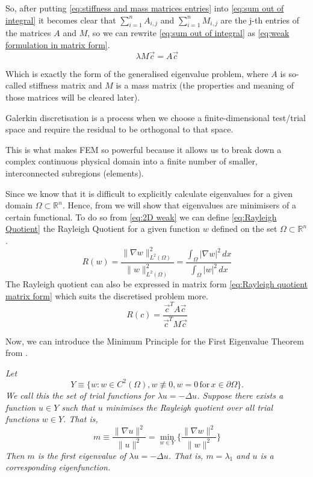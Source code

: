 \documentclass[acmsmall,screen]{MapleTrans}
\begin{document}
So, after putting \eqref{eq:stiffness and mass matrices entries} into \eqref{eq:sum out of integral} it becomes clear that $\sum^n_{i=1}A_{i,j}$ and $\sum^n_{i=1}M_{i,j}$ are the j-th entries of the matrices $A$ and $M$, so we can rewrite \eqref{eq:sum out of integral} as \eqref{eq:weak formulation in matrix form}.
\begin{equation}
    \lambda M\vec{c} = A\vec{c} 
    \label{eq:weak formulation in matrix form}
\end{equation}

Which is exactly the form of the generalised eigenvalue problem, where $A$ is so-called stiffness matrix and $M$ is a mass matrix (the properties and meaning of those matrices will be cleared later). 

Galerkin discretisation is a process when we choose a finite-dimensional test/trial space and require the residual to be orthogonal to that space.

This is what makes FEM so powerful because it allows us to break down a complex continuous physical domain into a finite number of smaller, interconnected subregions (elements).

Since we know that it is difficult to explicitly calculate eigenvalues for a given domain $\Omega \subset \mathbb{R}^n$. Hence, from \cite{b9.1} we will show that eigenvalues are minimisers of a certain functional.
To do so from \eqref{eq:2D weak} we can define \eqref{eq:Rayleigh Quotient} the Rayleigh Quotient for a given function $w$ defined on the set $\Omega \subset \mathbb{R}^n$.
\begin{equation}
    R(w) = \frac{\|\nabla w\|_{L^2(\Omega)}^2}{\|w\|_{L^2(\Omega)}^2} = \frac{\int_\Omega |\nabla w|^2 \, dx}{\int_\Omega |w|^2 \, dx}
    \label{eq:Rayleigh Quotient}
\end{equation}
The Rayleigh quotient can also be expressed in matrix form \eqref{eq:Rayleigh quotient matrix form} which suits the discretised problem more.
\begin{equation}
    R(c) = \frac{\vec{c}^TA\vec{c}}{\vec{c}^TM\vec{c}}
    \label{eq:Rayleigh quotient matrix form}
\end{equation}


Now, we can introduce the Minimum Principle for the First Eigenvalue Theorem from \cite{b0,b9.1}.

\textit{
    Let
    \begin{equation}
        Y \equiv \{w: w \in C^2(\Omega), w \not\equiv 0, w = 0 \, \text{for} \, x \in \partial\Omega\}.
    \end{equation}
    We call this the set of trial functions for $\lambda u = -\Delta u$. Suppose there exists a function $u \in Y$ such that $u$ minimises the Rayleigh quotient over all trial functions $w \in Y$.
    That is,
    \begin{equation}
        m \equiv \frac{\|\nabla u\|^2}{\|u\|^2} = \min_{w \in Y} \Bigg\{\frac{\|\nabla w\|^2}{\|w\|^2} \Bigg\}
    \end{equation}
    Then $m$ is the first eigenvalue of $\lambda u = -\Delta u$. That is, $m = \lambda_1$ and $u$ is a corresponding eigenfunction.
}
\end{document}
